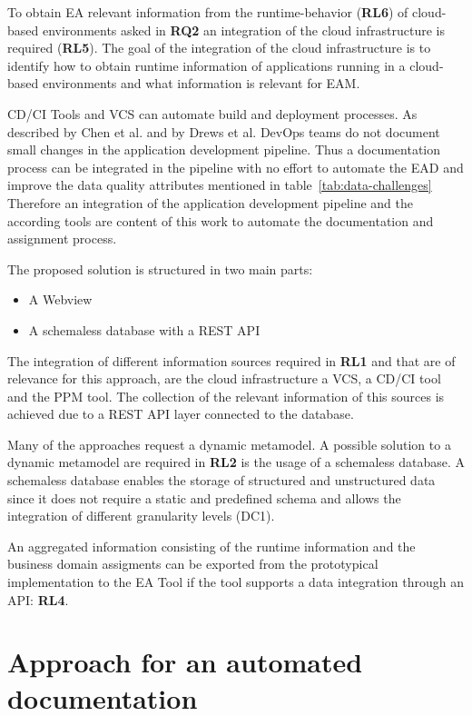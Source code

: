 To obtain EA relevant information from the runtime-behavior (\textbf{RL6}) of cloud-based environments asked in \textbf{RQ2} an integration of the cloud infrastructure is required (\textbf{RL5}). The goal of the integration of the cloud infrastructure is to identify how to obtain runtime information of applications running in a cloud-based environments and what information is relevant for EAM. 

CD/CI Tools and VCS can automate build and deployment processes. As described by Chen et al. \cite{Chen2015} and by Drews et al. \cite{Drews2017} DevOps teams do not document small changes in the application development pipeline. Thus a documentation process can be integrated in the pipeline with no effort to automate the EAD and improve the data quality attributes mentioned in table~\ref{tab:data-challenges} Therefore an integration of the application development pipeline and the according tools are content of this work to automate the documentation and assignment process.

The proposed solution is structured in two main parts:
\begin{itemize}
    \item A Webview
    \item A schemaless database with a REST API
\end{itemize}

The integration of different information sources required in \textbf{RL1} and that are of relevance for this approach, are the cloud infrastructure a VCS, a CD/CI tool and the PPM tool. The collection of the relevant information of this sources is achieved due to a REST API layer connected to the database.

Many of the approaches request a dynamic metamodel. A possible solution to a dynamic metamodel are required in \textbf{RL2} is the usage of a schemaless database. A schemaless database enables the storage of structured and unstructured data since it does not require a static and predefined schema and allows the integration of different granularity levels (DC1).

An aggregated information consisting of the runtime information and the business domain assigments can be exported from the prototypical implementation to the EA Tool if the tool supports a data integration through an API: \textbf{RL4}.

\section{Approach for an automated documentation}\label{section:approach-ead}

